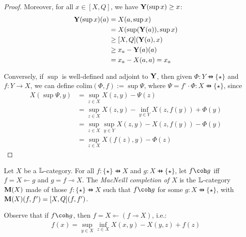 \begin{proof}
Moreover, for all $x\in [X,Q]$, we have $\mathbf{Y}(\sup x)\geq x$:  
\begin{align*}
\mathbf{Y}(\sup x)(a) &= X(a,\sup x)\\
&= X(  \sup(\mathbf{Y}(a)),\sup x) \\
& \geq [X,Q]( \mathbf{Y}(a), x)\\
&\geq x_{a}-\mathbf{Y}(a)(a) \\
&=
 x_{a}-X(a,a)  = x_{a}
\end{align*}
%
%
% 

Conversely, if $\sup$ is well-defined and adjoint to $\mathbf{Y}$, then 
given $\Phi: Y\pfun \{\star\}$ and $f:Y\to X$, 
we can define
$\mathrm{colim}(\Phi, f):= \sup\Psi$, where $\Psi=
 f^{\circ}\cdot \Phi: X\pfun \{\star\}$, since 
\begin{align*}
X(\sup \Psi, y)&=
\sup_{z\in X}X(z,y)-\Psi(z) \\
&=\sup_{z\in X}X(z,y)- \inf_{y\in Y}X(z,f(y))  +\Phi(y)\\
& = \sup_{z\in X}\sup_{y\in Y}X(z,y)-X(z,f(y))  -\Phi(y)\\
&=
\sup_{z\in X} X(f(z),y) - \Phi(z)
\end{align*}
\end{proof}



\begin{definition}
Let $X$ be a $\mathbb{L}$-category. For all $f: \{\star\}\pfun X$ and $g:X\pfun \{\star\}$, let $f \coh g$ iff 
$f  = X\multimapinv g $ and 
$g = f\multimap X$. 
The \emph{MacNeill completion of $X$} is the $\mathbb{L}$-category $\mathbf{M}(X)$ made of those 
$f:\{\star\}\pfun X$ such that $f\coh g$ for some $g:X\pfun \{\star\}$, with
$\mathbf{M}(X)(f,f')=[X,Q](f,f')$. 
\end{definition}


Observe that if $f\coh g$, then $f= X\multimapinv (f\multimap X)$, i.e.:
\begin{align}
f(x)=  \sup_{y\in X}\inf_{z\in X}X(x,y)-X(y,z) +f(z)       
\tag{COH}
\end{align}




